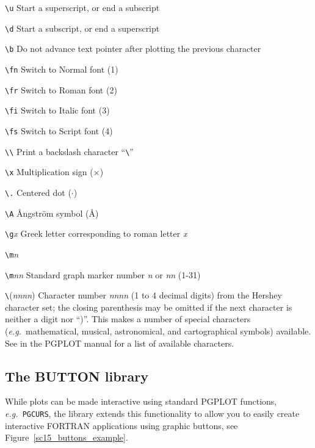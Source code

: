 \documentclass[twoside,11pt]{starlink}
\begin{document}
\begin{description}

\item \verb*|\u| Start a superscript, or end a subscript
\item \verb*|\d| Start a subscript, or end a superscript
\item \verb*|\b| Do not advance text pointer after plotting the previous character
\item \verb*|\fn| Switch to  Normal font (1)
\item \verb*|\fr| Switch to Roman font (2)
\item \verb*|\fi| Switch to Italic font (3)
\item \verb*|\fs| Switch to Script font (4)
\item \verb*|\\| Print a backslash character ``\verb*|\|''
\item \verb*|\x|  Multiplication sign ($\times$)
\item \verb*|\.| Centered dot ($\cdot$)
\item \verb*|\A| {\rm \AA}ngstr\"{o}m symbol ({\rm \AA})
\item \verb*|\g|\emph{x} Greek letter corresponding to roman letter \emph{x}
\item \verb*|\m|\emph{n}
\item \verb*|\m|\emph{nn} Standard graph marker number \emph{n} or \emph{nn} (1-31)

\item \verb*|\|(\emph{nnnn}) Character number \emph{nnnn} (1 to 4
      decimal digits) from the Hershey character set; the closing
      parenthesis may be omitted if the next character is neither a
      digit nor ``)''. This makes a number of special characters (\emph{e.g.\ }mathematical, musical, astronomical, and cartographical
      symbols) available. See  in the
      PGPLOT manual for a list of available characters.

\end{description}

\subsection{The BUTTON library\label{sc15_pgbut}}

While plots can be made interactive using standard PGPLOT functions,
\emph{e.g.\ }\texttt{PGCURS}, the
library extends this functionality to allow you to easily create
interactive FORTRAN applications using graphic buttons, see
Figure~\ref{sc15_buttons_example}.
\end{document}
